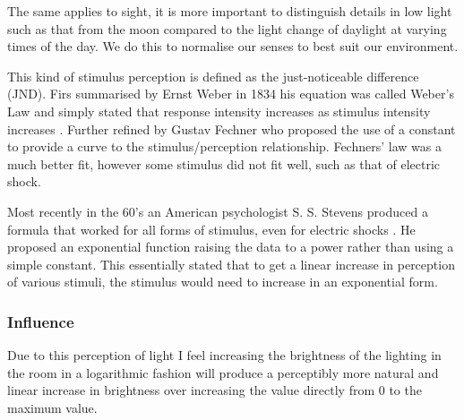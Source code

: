 The same applies to sight, it is more important to distinguish details
in low light such as that from the moon compared to the light change of
daylight at varying times of the day. We do this to normalise our senses
to best suit our environment.

This kind of stimulus perception is defined as the just-noticeable
difference (JND). Firs summarised by Ernst Weber in 1834 his equation
was called Weber's Law and simply stated that response intensity
increases as stimulus intensity increases
\parencite[p. 1613-1615]{salkind2010encyclopedia}. Further refined by
Gustav Fechner who proposed the use of a constant to provide a curve to
the stimulus/perception relationship. Fechners' law was a much better
fit, however some stimulus did not fit well, such as that of electric
shock.

Most recently in the 60's an American psychologist S. S. Stevens
produced a formula that worked for all forms of stimulus, even for
electric shocks \parencite{stevens1957psychophysical}. He proposed an
exponential function raising the data to a power rather than using a
simple constant. This essentially stated that to get a linear increase
in perception of various stimuli, the stimulus would need to increase in
an exponential form.

\subsubsection{Influence}\label{influence-2}

Due to this perception of light I feel increasing the brightness of the
lighting in the room in a logarithmic fashion will produce a perceptibly
more natural and linear increase in brightness over increasing the value
directly from 0 to the maximum value.
